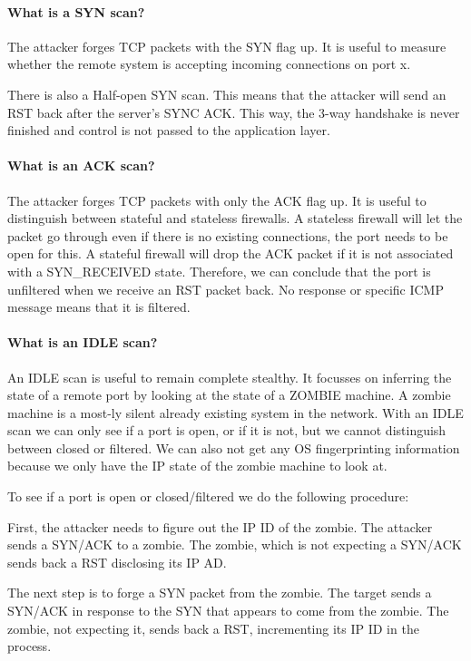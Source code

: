 \paragraph{What is a SYN scan?}
The attacker forges TCP packets with the SYN flag up. It is useful to measure whether the remote system is accepting incoming connections on port x.

There is also a Half-open SYN scan. This means that the attacker will send an RST back after the server's SYNC ACK. This way, the 3-way handshake is never finished and control is not passed to the application layer.

\paragraph{What is an ACK scan?}
The attacker forges TCP packets with only the ACK flag up. It is useful to distinguish between stateful and stateless firewalls. A stateless firewall will let the packet go through even if there is no existing connections, the port needs to be open for this. A stateful firewall will drop the ACK packet if it is not associated with a SYN\_RECEIVED state. Therefore, we can conclude that the port is unfiltered when we receive an RST packet back. No response or specific ICMP message means that it is filtered.

\paragraph{What is an IDLE scan?}
An IDLE scan is useful to remain complete stealthy. It focusses on inferring the state of a remote port by looking at the state of a ZOMBIE machine. A zombie machine is a most-ly silent already existing system in the network. With an IDLE scan we can only see if a port is open, or if it is not, but we cannot distinguish between closed or filtered. We can also not get any OS fingerprinting information because we only have the IP state of the zombie machine to look at.

To see if a port is open or closed/filtered we do the following procedure:

First, the attacker needs to figure out the IP ID of the zombie. The attacker sends a SYN/ACK to a zombie. The zombie, which is not expecting a SYN/ACK sends back a RST disclosing its IP AD.

The next step is to forge a SYN packet from the zombie. The target sends a SYN/ACK in response to the SYN that appears to come from the zombie. The zombie, not expecting it, sends back a RST, incrementing its IP ID in the process. 

